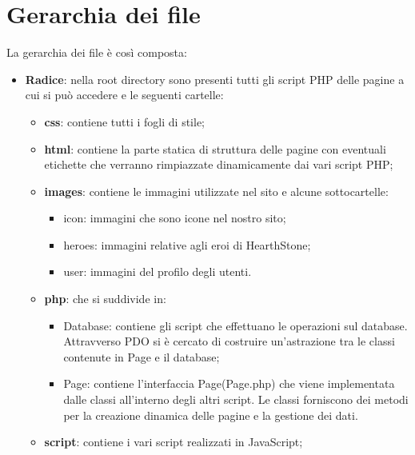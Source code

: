 \section{Gerarchia dei file}
La gerarchia dei file è così composta:
\begin{itemize}
	\item \textbf{Radice}: nella root directory sono presenti tutti gli script PHP delle pagine a cui si può accedere e le seguenti cartelle:
	\begin{itemize}
		\item \textbf{css}: contiene tutti i fogli di stile;
		\item \textbf{html}: contiene la parte statica di struttura delle pagine con eventuali etichette che verranno rimpiazzate dinamicamente dai vari script PHP;
		\item \textbf{images}: contiene le immagini utilizzate nel sito e alcune sottocartelle:
		\begin{itemize}
			\item{icon}: immagini che sono icone nel nostro sito;
			\item{heroes}: immagini relative agli eroi di HearthStone;
			\item{user}: immagini del profilo degli utenti.
		\end{itemize}
		\item \textbf{php}: che si suddivide in:
		\begin{itemize}
			\item {Database}: contiene gli script che effettuano le operazioni sul database. Attravverso PDO si è cercato di costruire un'astrazione tra le classi contenute in Page e il database;
			\item {Page}: contiene l'interfaccia Page(Page.php) che viene implementata dalle classi all'interno degli altri script. Le classi forniscono dei metodi per la creazione dinamica delle pagine e la gestione dei dati.
		\end{itemize}
		\item \textbf{script}: contiene i vari script realizzati in JavaScript;
	\end{itemize}
\end{itemize}


\newpage
